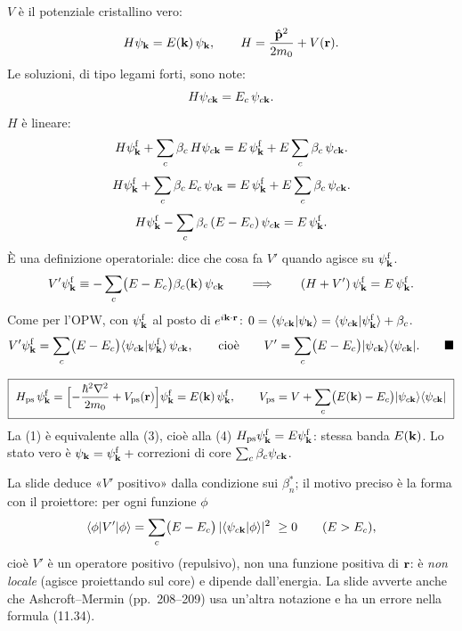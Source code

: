 \documentclass[11pt,a4paper]{article}
\begin{document}
\begin{dimostrazione}
$V$ è il potenziale cristallino vero:
\[
H\psi_{\mathbf k}=E(\mathbf k)\,\psi_{\mathbf k},\qquad H=\frac{\hat{\mathbf p}^2}{2m_0}+V(\mathbf r).
\]
Le soluzioni, di tipo legami forti, sono note:
\[
H\psi_{c\mathbf k}=E_c\,\psi_{c\mathbf k}.
\]
$H$ è lineare:
\[
H\psi^{\mathrm f}_{\mathbf k}+\sum_c\beta_c\,H\psi_{c\mathbf k}=E\,\psi^{\mathrm f}_{\mathbf k}+E\sum_c\beta_c\,\psi_{c\mathbf k}.
\]
\[
H\psi^{\mathrm f}_{\mathbf k}+\sum_c\beta_c\,E_c\,\psi_{c\mathbf k}=E\,\psi^{\mathrm f}_{\mathbf k}+E\sum_c\beta_c\,\psi_{c\mathbf k}.
\]
\[
H\psi^{\mathrm f}_{\mathbf k}-\sum_c\beta_c\,(E-E_c)\,\psi_{c\mathbf k}=E\,\psi^{\mathrm f}_{\mathbf k}.
\]
È una definizione operatoriale: dice che cosa fa $V'$ quando agisce su $\psi^{\mathrm f}_{\mathbf k}$.
\[
V'\psi^{\mathrm f}_{\mathbf k}\equiv-\sum_c\bigl(E-E_c\bigr)\beta_c(\mathbf k)\,\psi_{c\mathbf k}\qquad\Longrightarrow\qquad(H+V')\,\psi^{\mathrm f}_{\mathbf k}=E\,\psi^{\mathrm f}_{\mathbf k}.
\]
Come per l'OPW, con $\psi^{\mathrm f}_{\mathbf k}$ al posto di $e^{i\mathbf k\cdot\mathbf r}$: $0=\langle\psi_{c\mathbf k}|\psi_{\mathbf k}\rangle=\langle\psi_{c\mathbf k}|\psi^{\mathrm f}_{\mathbf k}\rangle+\beta_c$.
\[
V'\psi^{\mathrm f}_{\vk}=\sum_c\bigl(E-E_c\bigr)\langle\psi_{c\vk}|\psi^{\mathrm f}_{\vk}\rangle\,\psi_{c\vk},\qquad\text{cioè}\qquad
V'=\sum_c\bigl(E-E_c\bigr)|\psi_{c\vk}\rangle\langle\psi_{c\vk}| .\qed
\]
\end{dimostrazione}

\begin{chiave}
\[
\boxed{\ H_{\mathrm{ps}}\,\psi^{\mathrm f}_{\vk}=\Bigl[-\frac{\hbar^2\nabla^2}{2m_0}+V_{\mathrm{ps}}(\vr)\Bigr]\psi^{\mathrm f}_{\vk}=E(\vk)\,\psi^{\mathrm f}_{\vk},\qquad
V_{\mathrm{ps}}=V+\sum_c\bigl(E(\vk)-E_c\bigr)|\psi_{c\vk}\rangle\langle\psi_{c\vk}|\ }
\]
La (1) è equivalente alla (3), cioè alla (4) $H_{\mathrm{ps}}\psi^{\mathrm f}_{\mathbf k}=E\psi^{\mathrm f}_{\mathbf k}$: stessa banda $E(\mathbf k)$. Lo stato vero è
$\psi_{\mathbf k}=\psi^{\mathrm f}_{\mathbf k}+{}$correzioni di core $\sum_c\beta_c\psi_{c\mathbf k}$.
\end{chiave}

\begin{osservazione}[slide 19]
La slide deduce «$V'$ positivo» dalla condizione sui $\beta^*_n$; il motivo preciso è la forma con il proiettore: per ogni funzione $\phi$
\[
\langle\phi|V'|\phi\rangle=\sum_c\bigl(E-E_c\bigr)\,|\langle\psi_{c\vk}|\phi\rangle|^2\ \ge0\qquad(E>E_c),
\]
cioè $V'$ è un operatore positivo (repulsivo), non una funzione positiva di $\mathbf r$: è \emph{non locale} (agisce proiettando sul core) e dipende
dall'energia. La slide avverte anche che Ashcroft--Mermin (pp.~208--209) usa un'altra notazione e ha un errore nella formula (11.34).
\end{osservazione}
\end{document}
